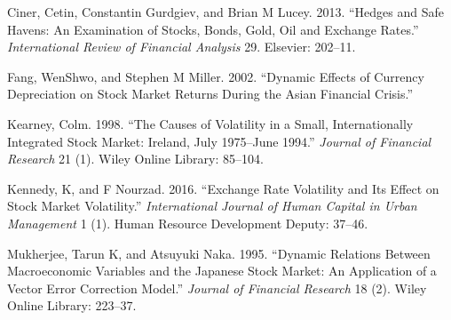 \documentclass[11pt,preprint, authoryear]{elsarticle}
\numberwithin{equation}{section}
\numberwithin{figure}{section}
\numberwithin{table}{section}
\begin{document}
\hypertarget{ref-ciner2013}{}
Ciner, Cetin, Constantin Gurdgiev, and Brian M Lucey. 2013. ``Hedges and
Safe Havens: An Examination of Stocks, Bonds, Gold, Oil and Exchange
Rates.'' \emph{International Review of Financial Analysis} 29. Elsevier:
202--11.

\hypertarget{ref-fang2002}{}
Fang, WenShwo, and Stephen M Miller. 2002. ``Dynamic Effects of Currency
Depreciation on Stock Market Returns During the Asian Financial
Crisis.''

\hypertarget{ref-kearney1998}{}
Kearney, Colm. 1998. ``The Causes of Volatility in a Small,
Internationally Integrated Stock Market: Ireland, July 1975--June
1994.'' \emph{Journal of Financial Research} 21 (1). Wiley Online
Library: 85--104.

\hypertarget{ref-kennedy2016}{}
Kennedy, K, and F Nourzad. 2016. ``Exchange Rate Volatility and Its
Effect on Stock Market Volatility.'' \emph{International Journal of
Human Capital in Urban Management} 1 (1). Human Resource Development
Deputy: 37--46.

\hypertarget{ref-mukherjee1995}{}
Mukherjee, Tarun K, and Atsuyuki Naka. 1995. ``Dynamic Relations Between
Macroeconomic Variables and the Japanese Stock Market: An Application of
a Vector Error Correction Model.'' \emph{Journal of Financial Research}
18 (2). Wiley Online Library: 223--37.

\newpage
\nocite{*}

\end{document}
